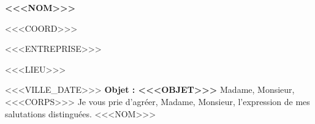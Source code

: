 \documentclass[11pt,a4paper]{article}
\begin{document}
\noindent
\begin{minipage}[t]{0.5\textwidth}
  \textbf{<<<NOM>>>}\par
  <<<COORD>>>
\end{minipage}
\begin{minipage}[t]{0.5\textwidth}
  \raggedleft
  <<<ENTREPRISE>>>\par
  <<<LIEU>>>
\end{minipage}
\vspace{1.2em}
\noindent <<<VILLE_DATE>>>
\vspace{0.6em}
\noindent\textbf{Objet : <<<OBJET>>>}
\vspace{0.6em}
\noindent Madame, Monsieur,
<<<CORPS>>>
\noindent Je vous prie d'agréer, Madame, Monsieur, l'expression de mes salutations
distinguées.
\vspace{1.6em}
\noindent\hfill <<<NOM>>>
\end{document}
